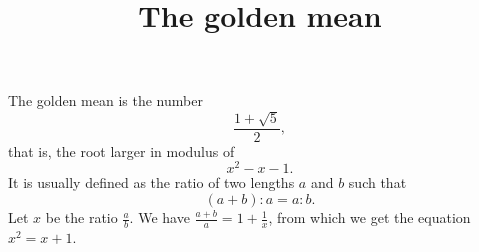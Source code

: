 \documentclass[a4paper,11pt]{article}
\title{The golden mean}
\author{}
\date{}
\begin{document}
\maketitle

The golden mean is the number
  \tagmcend
\tagstructend
\[\frac{1 + \sqrt{5}}{2},\] 
that is, the root larger in modulus of
  \tagmcend
\tagstructend
\begin{equation} x^2 - x - 1. \end{equation}
It is usually defined as the ratio of two lengths \auxiliaryspace
  \tagmcend
\tagstructend
 \(a\)
  and \auxiliaryspace
    \tagmcend
\tagstructend
\(b\) 
  such that 
  \tagmcend
\tagstructend
\begin{equation*} (a+b) : a = a : b. \end{equation*} 
Let \auxiliaryspace
  \tagmcend
\tagstructend
 \(x\) 
be the ratio \auxiliaryspace
  \tagmcend
\tagstructend
\( \frac{a}{b} \).
We have \auxiliaryspace
  \tagmcend
\tagstructend
\( \frac{a+b}{a} = 1 + \frac{1}{x} \), 
from which we get the equation \auxiliaryspace
  \tagmcend
\tagstructend
 \(x^2 = x + 1\).
\end{document}
